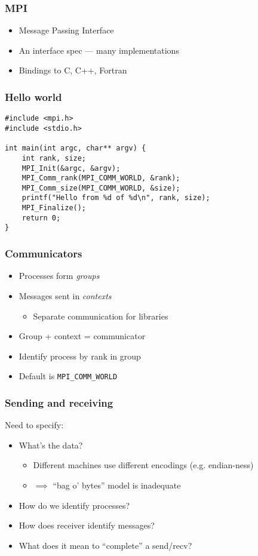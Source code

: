 \documentclass{beamer}
\begin{document}
\begin{frame}
  \frametitle{MPI}

  \begin{itemize}
  \item Message Passing Interface
  \item An interface spec --- many implementations
  \item Bindings to C, C++, Fortran
  \end{itemize}
\end{frame}


\begin{frame}[fragile]
  \frametitle{Hello world}

\begin{verbatim}
#include <mpi.h>
#include <stdio.h>

int main(int argc, char** argv) {
    int rank, size;
    MPI_Init(&argc, &argv);
    MPI_Comm_rank(MPI_COMM_WORLD, &rank);
    MPI_Comm_size(MPI_COMM_WORLD, &size);
    printf("Hello from %d of %d\n", rank, size);
    MPI_Finalize();
    return 0;
}
\end{verbatim}
\end{frame}


\begin{frame}
  \frametitle{Communicators}

  \begin{itemize}
  \item Processes form {\em groups}
  \item Messages sent in {\em contexts}
    \begin{itemize}
    \item Separate communication for libraries
    \end{itemize}
  \item Group + context = communicator
  \item Identify process by rank in group
  \item Default is {\tt MPI\_COMM\_WORLD}
  \end{itemize}

\end{frame}


\begin{frame}
  \frametitle{Sending and receiving}

  Need to specify:
  \begin{itemize}
  \item What's the data?
    \begin{itemize}
    \item Different machines use different encodings (e.g. endian-ness)
    \item $\implies$ ``bag o' bytes'' model is inadequate
    \end{itemize}
  \item How do we identify processes?
  \item How does receiver identify messages?
  \item What does it mean to ``complete'' a send/recv?
  \end{itemize}
\end{frame}
\end{document}
